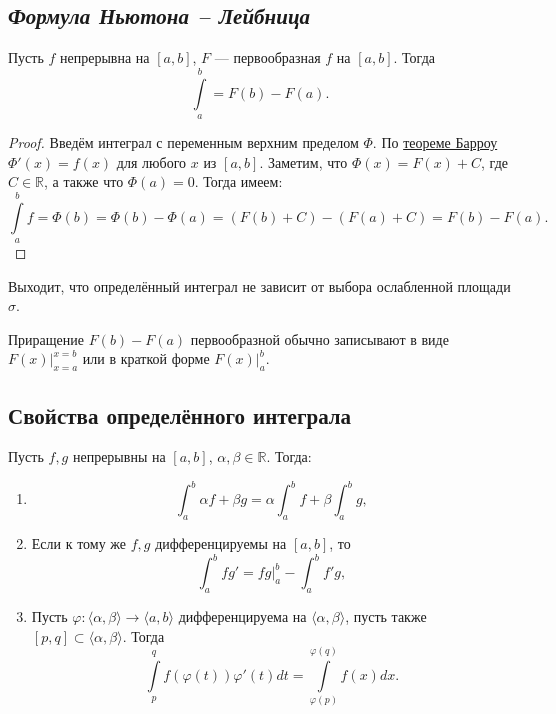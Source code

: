 \subsection{\itshape Формула Ньютона -- Лейбница}

\hypertarget{Newton}{}
\begin{theorem}
	Пусть $f$ непрерывна на $[a, b]$, $F$ --- первообразная $f$ на $[a, b]$. Тогда \[
		\int\limits_a^b = F(b) - F(a).
	\]
\end{theorem}

\begin{proof}
	Введём интеграл с переменным верхним пределом $\Phi$. По \hyperlink{Barrow}{теореме Барроу} $\Phi'(x) = f(x)$ для любого $x$ из $[a, b]$.
	Заметим, что $\Phi(x) = F(x) + C$, где $C \in \mathbb{R}$, а также что $\Phi(a) = 0$. Тогда имеем: \[
		\int\limits_a^b f = \Phi(b) = \Phi(b) - \Phi(a) = (F(b) + C) - (F(a) + C) = F(b) - F(a). 
	\]
\end{proof}

\begin{remark}
	Выходит, что определённый интеграл не зависит от выбора ослабленной площади $\sigma$.
\end{remark}

\begin{remark}
	Приращение $F(b) - F(a)$ первообразной обычно записывают в виде $F(x) \bigg|_{x = a}^{x = b}$ или в краткой форме $F(x) \bigg|_a^b$.
\end{remark}

\subsection{Свойства определённого интеграла}

\begin{theorem}
	Пусть $f, g$ непрерывны на $[a, b]$, $\alpha, \beta \in \mathbb{R}$. Тогда:
	\begin{enumerate}
		\item \[
			\int_a^b \alpha f + \beta g = \alpha \int_a^b f + \beta \int_a^b g,
		\]
		\item Если к тому же $f, g$ дифференцируемы на $[a, b]$, то \[
			\int_a^b fg' = fg \bigg|_a^b - \int_a^b f'g,
		\]
		\item Пусть $\varphi: \langle \alpha, \beta \rangle \to \langle a, b \rangle$ дифференцируема на $\langle \alpha, \beta \rangle$,
		пусть также $[p, q] \subset \langle \alpha, \beta \rangle$. Тогда \[
			\int\limits_p^q f(\varphi(t))\varphi'(t) dt = \int\limits_{\varphi(p)}^{\varphi(q)} f(x) dx.
		\]
	\end{enumerate}
\end{theorem}

